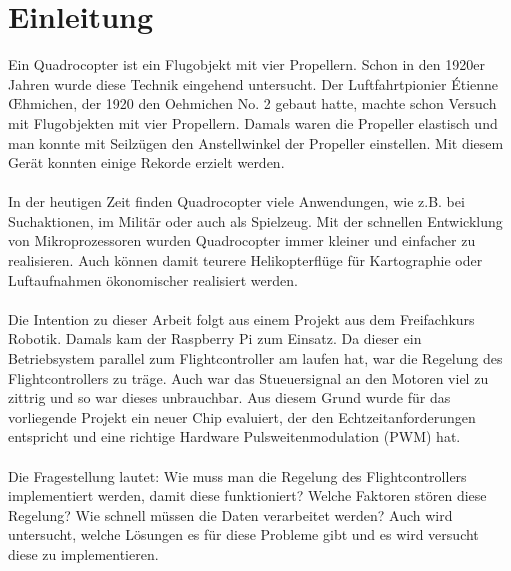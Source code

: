 \documentclass[12pt,a4paper, ngerman]{article}
\begin{document}
\section{Einleitung}
Ein Quadrocopter ist ein Flugobjekt mit vier Propellern. Schon in den 1920er Jahren wurde diese Technik eingehend untersucht. Der Luftfahrtpionier Étienne \OE hmichen, der 1920 den Oehmichen No. 2 gebaut hatte, machte schon Versuch mit Flugobjekten mit vier Propellern. Damals waren die Propeller elastisch und man konnte mit Seilzügen den Anstellwinkel der Propeller einstellen. Mit diesem Gerät konnten einige Rekorde erzielt werden.\cite{website:Wikipedia_Quadrocopter}\\ \\
In der heutigen Zeit finden Quadrocopter viele Anwendungen, wie z.B. bei Suchaktionen, im Militär oder auch als Spielzeug. Mit der schnellen Entwicklung von Mikroprozessoren wurden Quadrocopter immer kleiner und einfacher zu realisieren. Auch können damit teurere Helikopterflüge für Kartographie oder Luftaufnahmen ökonomischer realisiert werden.\cite{website:Wikipedia_Quad_Einsatz}\\ \\
Die Intention zu dieser Arbeit folgt aus einem Projekt aus dem Freifachkurs Robotik. Damals kam der Raspberry Pi zum Einsatz. Da dieser ein Betriebsystem parallel zum Flightcontroller am laufen hat, war die Regelung des Flightcontrollers zu träge. Auch war das Stueuersignal an den Motoren viel zu zittrig und so war dieses unbrauchbar. Aus diesem Grund wurde für das vorliegende Projekt ein neuer Chip evaluiert, der den Echtzeitanforderungen entspricht und eine richtige Hardware Pulsweitenmodulation (PWM) hat. \\ \\

Die Fragestellung lautet: Wie muss man die Regelung des Flightcontrollers implementiert werden, damit diese funktioniert? Welche Faktoren stören diese Regelung? Wie schnell müssen die Daten verarbeitet werden? Auch wird untersucht, welche Lösungen es für diese Probleme gibt und es wird versucht diese zu implementieren. \\ \\
\end{document}
